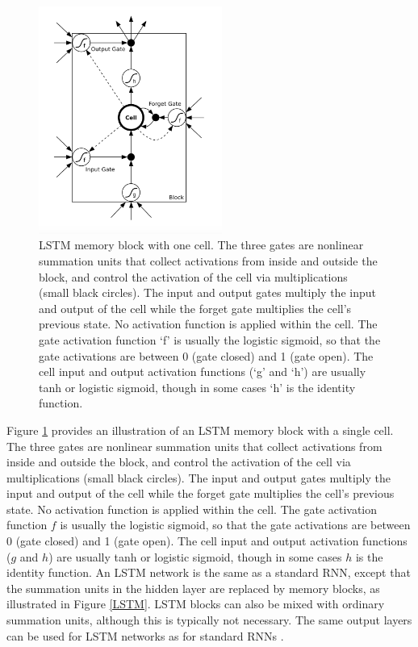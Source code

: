 \begin{figure}
	\centering
	\includegraphics[width=6cm]{img/LSTM_block.png}
	\caption{LSTM memory block with one cell. The three gates are nonlinear summation units that collect activations from inside and outside the block, and control the activation of the cell via multiplications (small black circles). The input and output gates multiply the input and output of the cell while the forget gate multiplies the cell’s previous state. No activation function is applied within the cell. The gate activation function ‘f’ is usually the logistic sigmoid, so that the gate activations are between 0 (gate closed) and 1 (gate open). The cell input and output activation functions (‘g’ and ‘h’) are usually tanh or logistic sigmoid, though in some cases ‘h’ is the identity function.}
	\label{LSTM_block}
\end{figure}

Figure \ref{LSTM_block} provides an illustration of an LSTM memory block with a single cell.
The three gates are nonlinear summation units that collect activations from inside and outside the block, and control the activation of the cell via multiplications (small black circles).
The input and output gates multiply the input and output of the cell while the forget gate multiplies the cell’s previous state. No activation function is applied within the cell. The gate activation function $f$ is usually the logistic sigmoid, so that the gate activations are between 0 (gate closed) and 1 (gate open). The cell input and output activation functions ($g$ and $h$) are usually tanh or logistic sigmoid, though in some cases $h$ is the identity function.
An LSTM network is the same as a standard RNN, except that the summation units in the hidden layer are replaced by memory blocks, as illustrated in Figure \ref{LSTM}. LSTM blocks can also be mixed with ordinary summation units, although this is typically not necessary. The same output layers can be used for LSTM networks as for standard RNNs \cite{graves2012supervised}.

